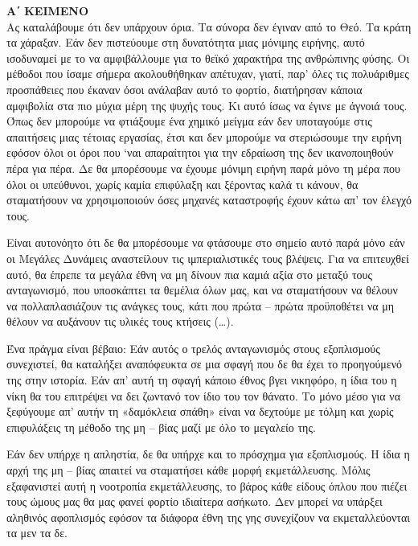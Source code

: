 \documentclass[twoside,nofonts,internet,fil,maria]{frontisthrio-diag}
\begin{document}
\textcolor{\xrwma}{\textbf{Α΄ ΚΕΙΜΕΝΟ}}\\

Ας καταλάβουμε ότι δεν υπάρχουν όρια. Τα σύνορα δεν έγιναν από το Θεό. Τα κράτη τα χάραξαν.
Εάν δεν πιστεύουμε στη δυνατότητα μιας μόνιμης ειρήνης, αυτό ισοδυναμεί με το να αμφιβάλλουμε για το θεϊκό χαρακτήρα της ανθρώπινης φύσης. Οι μέθοδοι που ίσαμε σήμερα ακολουθήθηκαν απέτυχαν, γιατί, παρ’ όλες τις πολυάριθμες προσπάθειες που έκαναν όσοι ανάλαβαν αυτό το φορτίο, διατήρησαν κάποια αμφιβολία στα πιο μύχια μέρη της ψυχής τους. Κι αυτό ίσως να έγινε με άγνοιά τους. Όπως δεν μπορούμε να φτιάξουμε ένα χημικό μείγμα εάν δεν υποταγούμε στις απαιτήσεις μιας τέτοιας εργασίας, έτσι και δεν μπορούμε να στεριώσουμε την ειρήνη εφόσον όλοι οι όροι που ‘ναι απαραίτητοι για την εδραίωση της δεν ικανοποιηθούν πέρα για πέρα. Δε θα μπορέσουμε να έχουμε μόνιμη ειρήνη παρά μόνο τη μέρα που όλοι οι υπεύθυνοι, χωρίς καμία επιφύλαξη και ξέροντας καλά τι κάνουν, θα σταματήσουν να χρησιμοποιούν όσες μηχανές καταστροφής έχουν κάτω απ’ τον έλεγχό τους.

Είναι αυτονόητο ότι δε θα μπορέσουμε να φτάσουμε στο σημείο αυτό παρά μόνο εάν οι Μεγάλες Δυνάμεις αναστείλουν τις ιμπεριαλιστικές τους βλέψεις. Για να επιτευχθεί αυτό, θα έπρεπε τα μεγάλα έθνη να μη δίνουν πια καμιά αξία στο μεταξύ τους ανταγωνισμό, που υποσκάπτει τα θεμέλια όλων μας, και να σταματήσουν να θέλουν να πολλαπλασιάζουν τις ανάγκες τους, κάτι που πρώτα – πρώτα προϋποθέτει να μη θέλουν να αυξάνουν τις υλικές τους κτήσεις (…).

Ένα πράγμα είναι βέβαιο: Εάν αυτός ο τρελός ανταγωνισμός στους εξοπλισμούς συνεχιστεί, θα καταλήξει αναπόφευκτα σε μια σφαγή που δε θα έχει το προηγούμενό της στην ιστορία. Εάν απ’ αυτή τη σφαγή κάποιο έθνος βγει νικηφόρο, η ίδια του η νίκη θα του επιτρέψει να δει ζωντανό τον ίδιο του τον θάνατο. Το μόνο μέσο για να ξεφύγουμε απ’ αυτήν τη «δαμόκλεια σπάθη» είναι να δεχτούμε με τόλμη και χωρίς επιφυλάξεις τη μέθοδο της μη – βίας μαζί με όλο το μεγαλείο της.

Εάν δεν υπήρχε η απληστία, δε θα υπήρχε και το πρόσχημα για εξοπλισμούς. Η ίδια η αρχή της μη – βίας απαιτεί να σταματήσει κάθε μορφή εκμετάλλευσης. Μόλις εξαφανιστεί αυτή η νοοτροπία εκμετάλλευσης, το βάρος κάθε είδους όπλου που πιέζει τους ώμους μας θα μας φανεί φορτίο ιδιαίτερα ασήκωτο. Δεν μπορεί να υπάρξει αληθινός αφοπλισμός εφόσον τα διάφορα έθνη της γης συνεχίζουν να εκμεταλλεύονται τα μεν τα δε.
\end{document}
